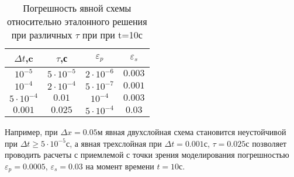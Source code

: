 \begin{table}[H]
\caption{Погрешность явной схемы относительно эталонного решения при различных $\tau$ при при t=10с}
\label{tabular:results}
\begin{center}
\begin{tabular}{|c|c|c|c|}
\hline
$\Delta t$,c & $\tau$,с & $\varepsilon_p$ & $\varepsilon_s$  \\
\hline
$ 10^{-5}$ & $5 \cdot 10^{-5}$ & $ 2 \cdot 10^{-6}$ & $ 0.003 $ \\
\hline
$ 10^{-4}$ & $2 \cdot 10^{-4}$ & $ 5 \cdot 10^{-7}$ & $ 0.001 $ \\
\hline
$5 \cdot 10^{-4}$ & $0.01$ & $ 10^{-4}$ & $ 0.003 $ \\
\hline
$0.001$ & $0.025$ & $ 5 \cdot 10^{-4}$ & $ 0.03 $ \\
\hline
\end{tabular}
\end{center}
\end{table}

Например, при $\Delta x=0.05$м явная двухслойная схема становится неустойчивой при $\Delta t \ge 5 \cdot 10^{-5}$с, а явная
трехслойная при $\Delta t=0.001$с, $\tau=0.025$с позволяет проводить расчеты с приемлемой с точки зрения моделирования
погрешностью $\varepsilon_p=0.0005$, $\varepsilon_s=0.03$ на момент времени $t=10$с.